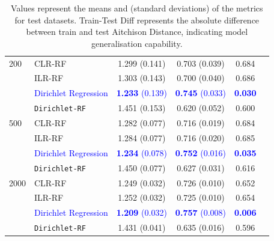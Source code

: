 \begin{frame}{}
{\begin{table}[htbp]
\begin{tabular}{|l|l|c|c|c|c|}
{200} 
    & CLR-RF & 1.299 (0.141) & 0.703 (0.039) & 0.684 \\
    & ILR-RF & 1.303 (0.143) & 0.700 (0.040)& 0.686 \\
    & \textcolor{blue}{Dirichlet Regression} & \textcolor{blue}{\textbf{1.233} (0.139)} & \textcolor{blue}{\textbf{0.745} (0.033)}  & \textcolor{blue}{\textbf{0.030}} \\
    & \texttt{Dirichlet-RF} & 1.451 (0.153) & 0.620 (0.052)  & 0.600 \\
\hline
{500}
    & CLR-RF & 1.282 (0.077) & 0.716 (0.019)  & 0.684 \\
    & ILR-RF & 1.284 (0.077) & 0.716 (0.020)& 0.685 \\
    & \textcolor{blue}{Dirichlet Regression} & \textcolor{blue}{\textbf{1.234} (0.078)} & \textcolor{blue}{\textbf{0.752} (0.016)}  & \textcolor{blue}{\textbf{0.035}} \\
    & \texttt{Dirichlet-RF} & 1.450 (0.077) & 0.627 (0.031) & 0.616 \\
\hline
{2000}
    & CLR-RF & 1.249 (0.032) & 0.726 (0.010) & 0.652 \\
    & ILR-RF & 1.252 (0.032) & 0.725 (0.010)  & 0.654 \\
    & \textcolor{blue}{Dirichlet Regression} & \textcolor{blue}{\textbf{1.209} (0.032)} & \textcolor{blue}{\textbf{0.757} (0.008)}  & \textcolor{blue}{\textbf{0.006}} \\
    & \texttt{Dirichlet-RF} & 1.431 (0.041) & 0.635 (0.016) & 0.596 \\
\hline
\end{tabular}
\caption{ Values represent the means and (standard deviations) of the metrics for test datasets. Train-Test Diff represents the absolute difference between train and test Aitchison Distance, indicating model generalisation capability. }
\label{tab:performance-comparison1}
\end{table}}

\end{frame}
